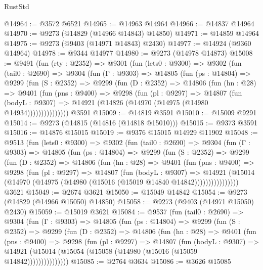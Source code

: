 \begin{lexlean}{RustStd}
\begin{coremodule}
@14964 := @3572 @6521
@14965 := @14963 @14964
@14966 := @14837 @14964
@14970 := @9273 (@14829 (@14966 @14843) @14850)
@14971 := @14859 @14964
@14975 := @9273 (@9403 (@14971 @14843) @2430)
@14977 := @14924 (@9360 @14964)
@14978 := @9344 @14977
@14980 := @9273 (@14978 @14873)
@15008 := @9491
    (fun (rty : @2352) =>
    @9301
      (fun (lets0 : @9300) =>
      @9302
        (fun (tail0 : @2690) =>
        @9304
          (fun (Γ : @9303) =>
          @14805
            (fun (ps : @14804) =>
            @9299
              (fun (S : @2352) =>
              @9299
                (fun (D : @2352) =>
                @14806
                  (fun (hn : @28) =>
                  @9401
                    (fun (pns : @9400) =>
                    @9298
                      (fun (pl : @9297) =>
                      @14807
                        (fun (bodyL : @9307) =>
                        @14921 (@14826 (@14970 (@14975 (@14980 @14934)))))))))))))))
    @3591
@15009 := @14819 @3591
@15010 := @15009 @9291
@15014 := @9273 (@14815 (@14816 (@14818 @15010)))
@15015 := @9373 @3591
@15016 := @14876 @15015
@15019 := @9376 @15015 @14929 @11902
@15048 := @9513
    (fun (lets0 : @9300) =>
    @9302
      (fun (tail0 : @2690) =>
      @9304
        (fun (Γ : @9303) =>
        @14805
          (fun (ps : @14804) =>
          @9299
            (fun (S : @2352) =>
            @9299
              (fun (D : @2352) =>
              @14806
                (fun (hn : @28) =>
                @9401
                  (fun (pns : @9400) =>
                  @9298
                    (fun (pl : @9297) =>
                    @14807
                      (fun (bodyL : @9307) =>
                      @14921
                        (@15014
                          (@14970 (@14975 (@14980 (@15016 (@15019 @14840 @14842))))))))))))))))
    @3621
@15049 := @2674 @3621
@15050 := @15049 @14842
@15054 := @9273 (@14829 (@14966 @15050) @14850)
@15058 := @9273 (@9403 (@14971 @15050) @2430)
@15059 := @15019 @3621
@15084 := @9537
    (fun (tail0 : @2690) =>
    @9304
      (fun (Γ : @9303) =>
      @14805
        (fun (ps : @14804) =>
        @9299
          (fun (S : @2352) =>
          @9299
            (fun (D : @2352) =>
            @14806
              (fun (hn : @28) =>
              @9401
                (fun (pns : @9400) =>
                @9298
                  (fun (pl : @9297) =>
                  @14807
                    (fun (bodyL : @9307) =>
                    @14921 (@15014 (@15054 (@15058 (@14980 (@15016 (@15059 @14842)))))))))))))))
@15085 := @2764 @3634
@15086 := @3626 @15085

\end{coremodule}
\end{lexlean}
